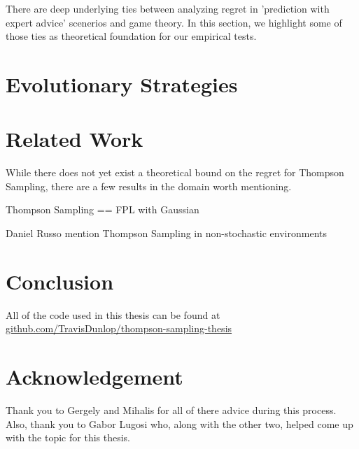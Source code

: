 \documentclass[10pt,a4paper]{article} %
\begin{document}
	There are deep underlying ties between analyzing regret in 'prediction with expert advice' scenerios and game theory.  In this section, we highlight some of those ties as theoretical foundation for our empirical tests.  
	

	\section{Evolutionary Strategies}	

	\section{Related Work}
	
	While there does not yet exist a theoretical bound on the regret for Thompson Sampling, there are a few results in the domain worth mentioning. 
	
	Thompson Sampling == FPL with Gaussian
	
	Daniel Russo mention Thompson Sampling in non-stochastic environments

	\section{Conclusion}
	
	All of the code used in this thesis can be found at \url{github.com/TravisDunlop/thompson-sampling-thesis}
	
	\section{Acknowledgement}
	
	Thank you to Gergely and Mihalis for all of there advice during this process.  Also, thank you to Gabor Lugosi who, along with the other two, helped come up with the topic for this thesis.
	
	\nocite{*}
	
	
\end{document}
